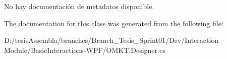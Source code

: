 No hay documentación de metadatos disponible. 



The documentation for this class was generated from the following file\-:\begin{DoxyCompactItemize}
\item 
D\-:/tesis\-Assembla/branches/\-Branch\-\_\-\-Tesis\-\_\-\-Sprint01/\-Dev/\-Interaction Module/\-Basic\-Interactions-\/\-W\-P\-F/O\-M\-K\-T.\-Designer.\-cs\end{DoxyCompactItemize}
